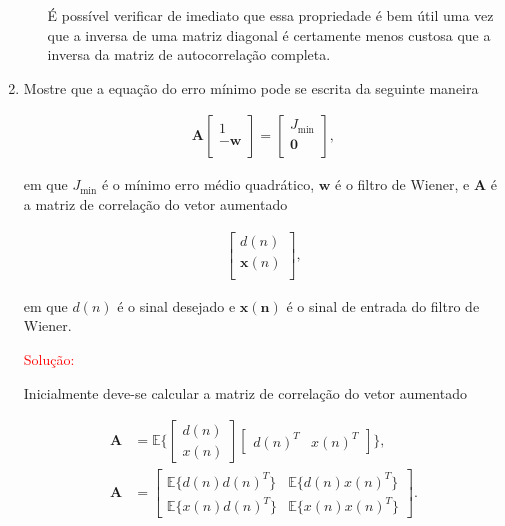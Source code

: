 \documentclass[a4paper,10pt]{article}
\begin{document}
\begin{enumerate}
\begin{enumerate}
						É possível verificar de imediato que essa propriedade é bem útil uma vez que a inversa de uma matriz diagonal é certamente menos custosa que a inversa da matriz de autocorrelação completa.
					
				\end{enumerate}
			
			\item Mostre que a equação do erro mínimo pode se escrita da seguinte maneira
			
				\begin{align*}
					\mathbf{A}\left[ \begin{matrix}
						1  \\
						{ - \mathbf{w}}  \\
					\end{matrix} \right] = \left[ \begin{matrix}
						J_{\text{min}}  \\
						\mathbf{0}  \\
					\end{matrix} \right],
				\end{align*}
				
				em que $J_{\text{min}}$ é o mínimo erro médio quadrático, $\mathbf{w}$ é o filtro de Wiener, e $\mathbf{A}$ é a matriz de
				correlação do vetor aumentado
				
				\begin{align*}
					\left[ \begin{matrix}
						d(n)  \\
						\mathbf{x}(n)  \\
					\end{matrix} \right],
				\end{align*}
				
				em que $d(n)$ é o sinal desejado e $\mathbf{x(n)}$ é o sinal de entrada do filtro de Wiener.
				
				\textcolor{red}{Solução:}
				
				Inicialmente deve-se calcular a matriz de correlação do vetor aumentado
				
				\begin{align}
					\mathbf{A} &= \mathbb{E} \{ \left[ \begin{matrix} d(n) \\ x(n) \end{matrix} \right] \left[ \begin{matrix} d(n)^{T} & x(n)^{T} \end{matrix} \right] \}, \\
					\mathbf{A} &=   \left[ \begin{matrix} \mathbb{E}\{d(n) d(n)^{T}\} & \mathbb{E}\{d(n) x(n)^{T}\} \\ \mathbb{E}\{x(n) d(n)^{T}\} & \mathbb{E}\{x(n) x(n)^{T}\} \end{matrix} \right].
				\end{align}
				

\end{enumerate}
\end{document}
